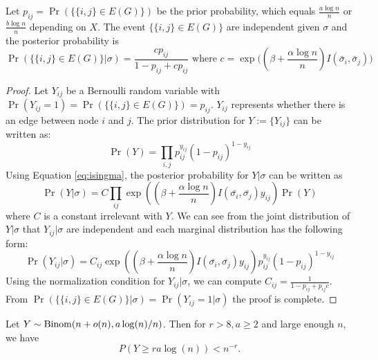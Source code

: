 \documentclass{article}
\begin{document}
\begin{lemma}\label{lem:post_independent}
	Let $p_{ij}=\Pr(\{\{i,j\} \in E(G) \})$ be the prior probability, which equals $\frac{a\log n}{n}$ or $\frac{b\log n}{n}$ depending on $X$.
	The event $\{\{i,j\} \in E(G) \}$ are independent given $\sigma$ and the posterior probability is
	\begin{equation}
	\Pr(\{\{i,j\} \in E(G) \} | \sigma) = \frac{c p_{ij} }{1-p_{ij} + cp_{ij}} \text{ where  } c= \exp\Big((\beta + \frac{\alpha \log n}{n} ) I(\bar{\sigma}_i, \bar{\sigma}_j) \Big)
	\end{equation}
\end{lemma}
\begin{proof}
	Let $Y_{ij}$ be a Bernoulli random variable with $\Pr(Y_{ij} = 1) = \Pr(\{\{i,j\} \in E(G)\}) = p_{ij}$. $Y_{ij}$ represents whether there is an edge between node $i$ and $j$.
	The prior distribution for $Y:=\{Y_{ij}\}$ can be written as:
	$$
	\Pr(Y) = \prod_{i,j} p_{ij}^{y_{ij}} (1-p_{ij})^{1-y_{ij}}
	$$ 
	Using Equation \eqref{eq:isingma}, the posterior probability for $Y| \sigma$ can be written as
	$$
	\Pr(Y|\sigma) = C\prod_{ij} \exp((\beta + \frac{\alpha \log n}{n})I(\bar{\sigma_i}, \bar{\sigma_j} )y_{ij}) \Pr(Y)
	$$
	where $C$ is a constant irrelevant with $Y$.
	We can see from the joint distribution of $Y|\sigma$ that $Y_{ij} | \sigma$ are independent and each marginal distribution has the following form:
	$$
	\Pr(Y_{ij} | \sigma) = C_{ij} \exp((\beta + \frac{\alpha \log n}{n})I(\bar{\sigma_i}, \bar{\sigma_j} )y_{ij}) p_{ij}^{y_{ij}} (1-p_{ij})^{1-y_{ij}}
	$$
	Using the normalization condition for $Y_{ij} | \sigma $, we can compute $C_{ij} = \frac{1}{1-p_{ij} + p_{ij}c}$. From $\Pr(\{\{i,j\} \in E(G) \} | \sigma) =\Pr(Y_{ij}=1|\sigma)$ the proof is complete.
\end{proof}


\begin{lemma} \label{lm:bmd}
	Let $Y\sim \operatorname{Binom}(n + o(n), a\log(n)/n)$. Then for $r>8, a \geq 2$ and large enough $n$, we have
	$$
	P(Y\ge r a \log(n)) < n^{-r} .
	$$
\end{lemma}
\end{document}
